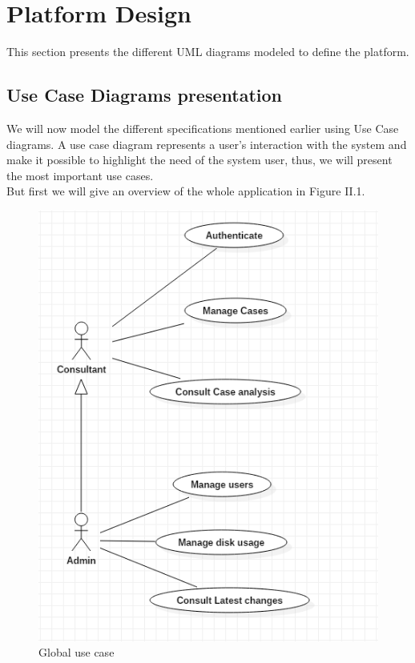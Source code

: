 \section{Platform Design}
This section presents the different UML diagrams modeled to define the platform.
\subsection{Use Case Diagrams presentation}
We will now model the different specifications mentioned earlier using Use Case diagrams. A use case diagram represents a user’s interaction with the system and make it possible to highlight the need of the system user, thus, we will present the most important use cases.\\
But first we will give an overview of the whole application in Figure II.1.
\begin{figure}[H]
\centering
\includegraphics[width=0.6\columnwidth]{Figures/usecase.png}
\caption{Global use case}
\end{figure}
